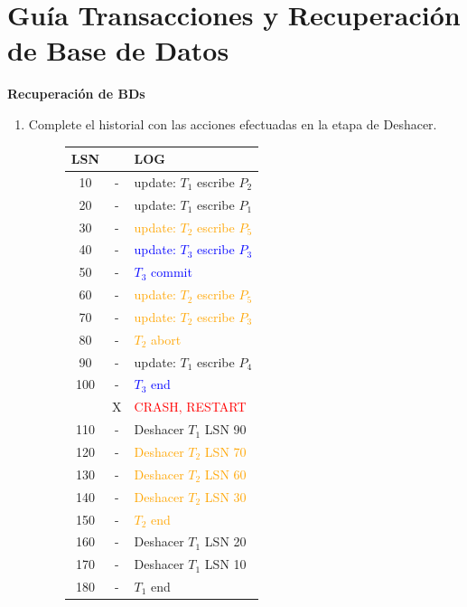 \documentclass{templateNote}
\begin{document}
\newpage
\section*{Guía Transacciones y Recuperación de Base de Datos}
\textbf{Recuperación de BDs}

\begin{enumerate}
    \item Complete el historial con las acciones efectuadas en la etapa de Deshacer.
    \begin{figure}[H]
        \centering
        \begin{tabular}{|c|c|l|}
            \hline
            \textbf{LSN} & & \textbf{LOG} \\ \hline
            10 & - & \textcolor{green!80!black}{update: $T_1$ escribe $P_2$} \\
            20 & - & \textcolor{green!80!black}{update: $T_1$ escribe $P_1$} \\
            30 & - & \textcolor{orange}{update: $T_2$ escribe $P_5$} \\
            40 & - & \textcolor{blue}{update: $T_3$ escribe $P_3$} \\
            50 & - & \textcolor{blue}{$T_3$ commit} \\
            60 & - & \textcolor{orange}{update: $T_2$ escribe $P_5$} \\
            70 & - & \textcolor{orange}{update: $T_2$ escribe $P_3$} \\
            80 & - & \textcolor{orange}{$T_2$ abort} \\
            90 & - & \textcolor{green!80!black}{update: $T_1$ escribe $P_4$} \\
            100 & - & \textcolor{blue}{$T_3$ end} \\
            & X & \textcolor{red}{CRASH, RESTART} \\ \hline
            110 & - & \textcolor{green!80!black}{Deshacer $T_1$ LSN 90} \\
            120 & - & \textcolor{orange}{Deshacer $T_2$ LSN 70} \\
            130 & - & \textcolor{orange}{Deshacer $T_2$ LSN 60} \\
            140 & - & \textcolor{orange}{Deshacer $T_2$ LSN 30} \\
            150 & - & \textcolor{orange}{$T_2$ end} \\
            160 & - & \textcolor{green!80!black}{Deshacer $T_1$ LSN 20} \\
            170 & - & \textcolor{green!80!black}{Deshacer $T_1$ LSN 10} \\
            180 & - & \textcolor{green!80!black}{$T_1$ end} \\ \hline
        \end{tabular}   
    \end{figure}


\end{enumerate}
\end{document}
